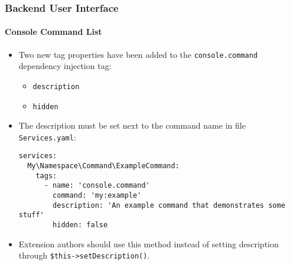%

\begin{frame}[fragile]
	\frametitle{Backend User Interface}
	\framesubtitle{Console Command List}


	\begin{itemize}
		\item Two new tag properties have been added to the \texttt{console.command}
			dependency injection tag:

			\begin{itemize}
				\item \texttt{description}
				\item \texttt{hidden}
			\end{itemize}

		\item The description must be set next to the command name in file
			\texttt{Services.yaml}:

\begin{lstlisting}
services:
  My\Namespace\Command\ExampleCommand:
    tags:
      - name: 'console.command'
        command: 'my:example'
        description: 'An example command that demonstrates some stuff'
        hidden: false
\end{lstlisting}

		\item Extension authors should use this method instead of setting
			description through \texttt{\$this->setDescription()}.

	\end{itemize}

\end{frame}

